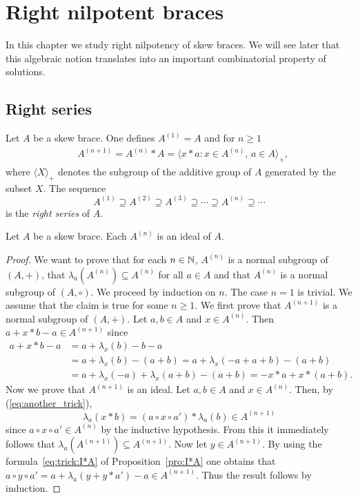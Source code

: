 \chapter{Right nilpotent braces}

In this chapter we study right nilpotency of skew braces. 
We will see later that this algebraic notion translates into an important combinatorial 
property of solutions. 

\section{Right series}

\begin{definition}
Let $A$ be a skew brace. 
One defines
$A^{(1)}=A$ and for $n\geq1$
\begin{align*}
    & A^{(n+1)}=A^{(n)}*A=\langle x*a: x\in A^{(n)},\,a\in A\rangle_+,
\end{align*}
where $\langle X\rangle_+$ denotes the subgroup of the additive group of $A$
generated by the subset $X$.  The sequence 
\[
A^{(1)}\supseteq A^{(2)}\supseteq
A^{(3)}\supseteq\cdots\supseteq A^{(n)}\supseteq\cdots
\]
is the \emph{right series} of $A$.
\end{definition}

\begin{proposition}
    \label{pro:right_series}
    Let $A$ be a skew brace. Each $A^{(n)}$ is an ideal of $A$.
\end{proposition}

\begin{proof}
    We want to prove that for each $n\in\mathbb{N}$, $A^{(n)}$ is a normal subgroup of
    $(A,+)$, that $\lambda_a(A^{(n)})\subseteq A^{(n)}$ for all $a\in A$ and
    that $A^{(n)}$ is a normal subgroup of $(A,\circ)$. We proceed by induction on $n$.
    The case $n=1$ is trivial. We assume that the claim is true for some $n\geq1$.  We first prove that
    $A^{(n+1)}$ is a normal subgroup of $(A,+)$. Let $a,b\in A$ and $x\in
    A^{(n)}$. Then $a+x*b-a\in A^{(n+1)}$ since
    \begin{align*}
        a+x*b-a&=a+\lambda_x(b)-b-a\\
        &=a+\lambda_x(b)-(a+b)
        =a+\lambda_x(-a+a+b)-(a+b)\\
        &=a+\lambda_x(-a)+\lambda_x(a+b)-(a+b)
        =-x*a+x*(a+b).
    \end{align*}
    Now we prove that $A^{(n+1)}$ is an ideal.
    Let $a,b\in A$ and $x\in A^{(n)}$. Then, by (\ref{eq:another_trick}),
    \[\lambda_a(x*b)=(a\circ x\circ a')*\lambda_a(b)\in A^{(n+1)}\]
since $a\circ x\circ a'\in A^{(n)}$ by the inductive hypothesis.
From this it immediately follows that
$\lambda_a(A^{(n+1)})\subseteq A^{(n+1)}$.  Now let $y\in
A^{(n+1)}$. By using the formula~\eqref{eq:trick:I*A} of Proposition~\ref{pro:I*A} one obtains that
$a\circ y\circ a' =a+\lambda_a(y+y*a')-a\in A^{(n+1)}$. Thus
the result follows by induction.
\end{proof}

